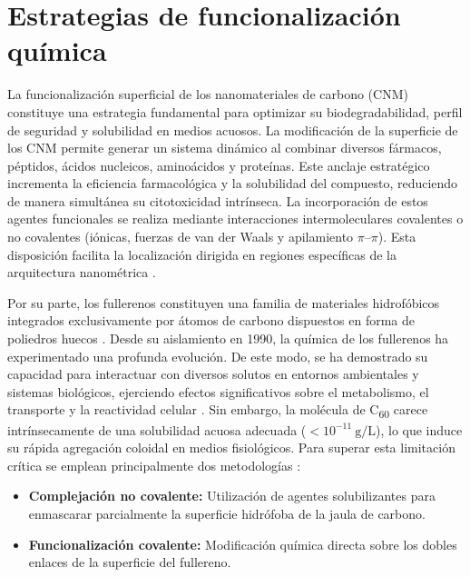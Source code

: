 \section{Estrategias de funcionalización química}

La funcionalización superficial de los nanomateriales de carbono (CNM) constituye una estrategia fundamental para optimizar su biodegradabilidad, perfil de seguridad y solubilidad en medios acuosos. La modificación de la superficie de los CNM permite generar un sistema dinámico al combinar diversos fármacos, péptidos, ácidos nucleicos, aminoácidos y proteínas. Este anclaje estratégico incrementa la eficiencia farmacológica y la solubilidad del compuesto, reduciendo de manera simultánea su citotoxicidad intrínseca. La incorporación de estos agentes funcionales se realiza mediante interacciones intermoleculares covalentes o no covalentes (iónicas, fuerzas de van der Waals y apilamiento $\pi$--$\pi$). Esta disposición facilita la localización dirigida en regiones específicas de la arquitectura nanométrica \cite{gaur2021biomedical}.

Por su parte, los fullerenos constituyen una familia de materiales hidrofóbicos integrados exclusivamente por átomos de carbono dispuestos en forma de poliedros huecos \cite{sharoyko2021biologically}. %
 Desde su aislamiento en 1990, la química de los fullerenos ha experimentado una profunda evolución. De este modo, se ha demostrado su capacidad para interactuar con diversos solutos en entornos ambientales y sistemas biológicos, ejerciendo efectos significativos sobre el metabolismo, el transporte y la reactividad celular \cite{ chang2024recent, bai2024research}. Sin embargo, la molécula de C\textsubscript{60} carece intrínsecamente de una solubilidad acuosa adecuada ($< 10^{-11}\ \text{g/L}$), lo que induce su rápida agregación coloidal en medios fisiológicos. Para superar esta limitación crítica se emplean principalmente dos metodologías \cite{sosnowska2019mechano}:

\begin{itemize}
    \item \textbf{Complejación no covalente:} Utilización de agentes solubilizantes para enmascarar parcialmente la superficie hidrófoba de la jaula de carbono.
    \item \textbf{Funcionalización covalente:} Modificación química directa sobre los dobles enlaces de la superficie del fullereno.
\end{itemize}

